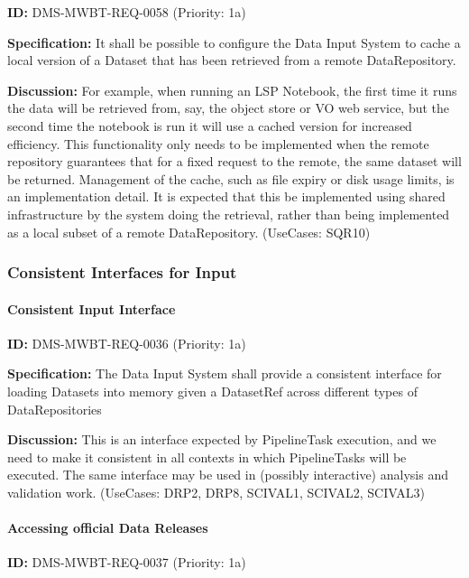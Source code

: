 \documentclass[SE,toc,lsstdraft]{lsstdoc}
\begin{document}
\label{DMS-MWBT-REQ-0058}
\textbf{ID:} DMS-MWBT-REQ-0058 (Priority: 1a)

\textbf{Specification:}
It shall be possible to configure the Data Input System to cache a local version of a Dataset that has been retrieved from a remote DataRepository.

\textbf{Discussion:}
For example, when running an LSP Notebook, the first time it runs the data will be retrieved from, say, the object store or VO web service, but the second time the notebook is run it will use a cached version for increased efficiency. This functionality only needs to be implemented when the remote repository guarantees that for a fixed request to the remote, the same dataset will be returned. Management of the cache, such as file expiry or disk usage limits, is an implementation detail. It is expected that this be implemented using shared infrastructure by the system doing the retrieval, rather than being implemented as a local subset of a remote DataRepository. (UseCases: SQR10)

\subsubsection{Consistent Interfaces for Input}

\paragraph{Consistent Input Interface}\hfill  %

\label{DMS-MWBT-REQ-0036}
\textbf{ID:} DMS-MWBT-REQ-0036 (Priority: 1a)

\textbf{Specification:}
The Data Input System shall provide a consistent interface for loading Datasets into memory given a DatasetRef across different types of DataRepositories

\textbf{Discussion:}
This is an interface expected by PipelineTask execution, and we need to make it consistent in all contexts in which PipelineTasks will be executed. The same interface may be used in (possibly interactive) analysis and validation work. (UseCases: DRP2, DRP8, SCIVAL1, SCIVAL2, SCIVAL3)

\paragraph{Accessing official Data Releases}\hfill  %

\label{DMS-MWBT-REQ-0037}
\textbf{ID:} DMS-MWBT-REQ-0037 (Priority: 1a)
\end{document}
